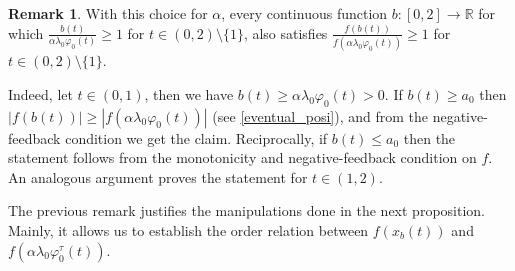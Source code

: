 \documentclass[a4paper,11pt]{article}
\theoremstyle{plain}
\theoremstyle{definition}
\newtheorem{remark}[thm]{Remark}
\theoremstyle{definition}
\newcommand{\R}{\mathbb{R}}
\numberwithin{equation}{section}
\begin{document}
\begin{remark}
With this choice for $\alpha$, every continuous function $b\colon [0,2]\to \R$ for which $\frac{b(t)}{\alpha\lambda_0 \varphi_0(t)}\geq 1$ for $t\in(0,2)\setminus\{1\}$, also satisfies $\frac{f(b(t))}{f(\alpha\lambda_0 \varphi_0(t))}\geq 1$ for $t\in(0,2)\setminus\{1\}$.

Indeed, let $t\in(0,1)$, then we have $b(t)\geq \alpha\lambda_0\varphi_0(t)>0$. If $b(t)\geq a_0$ then $|f(b(t))|\geq |f(\alpha\lambda_0\varphi_0(t))|$ (see \eqref{eventual_posi}), and from the negative-feedback condition we get the claim. Reciprocally, if $b(t)\leq a_0$ then the statement follows from the monotonicity and negative-feedback condition on $f$. An analogous argument proves the statement for $t\in(1,2)$.
\end{remark}

The previous remark justifies the manipulations done in the next proposition. Mainly, it allows us to establish the order relation between $f(x_b(t))$ and $f(\alpha\lambda_0 \varphi_0^\tau(t))$.
\end{document}
